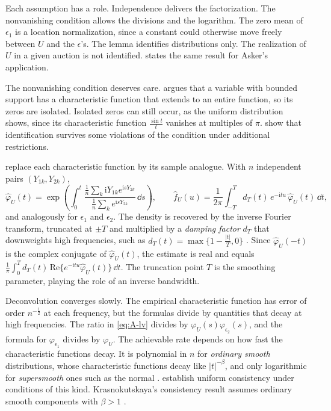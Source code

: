 Each assumption has a role. Independence delivers the factorization. The nonvanishing condition allows
the divisions and the logarithm. The zero mean of $\epsilon_1$ is a location normalization, since a
constant could otherwise move freely between $U$ and the $\epsilon$'s. The lemma identifies
distributions only. The realization of $U$ in a given auction is not identified.  states
the same result for Asker's application.

The nonvanishing condition deserves care. \citet[Lemma~1]{Krasnokutskaya2011} argues that a variable
with bounded support has a characteristic function that extends to an entire function, so its zeros are
isolated. Isolated zeros can still occur, as the uniform distribution shows, since its characteristic
function $\frac{\sin t}{t}$ vanishes at multiples of $\pi$. \citet{EvdokimovWhite2012} show that
identification survives some violations of the condition under additional restrictions.

\citet{LiVuong1998} replace each characteristic function by its sample analogue. With $n$ independent
pairs $(Y_{1k},Y_{2k})$,
\begin{equation}\label{eq:A-lv}
\hat\varphi_U(t)=\exp\left(\int_0^t\frac{\frac{1}{n}\sum_k\mathrm{i}Y_{1k}e^{\mathrm{i}sY_{2k}}}{\frac{1}{n}\sum_ke^{\mathrm{i}sY_{2k}}}\,\dd s\right),\qquad
\hat f_U(u)=\frac{1}{2\pi}\int_{-T}^{T}d_T(t)\,e^{-\mathrm{i}tu}\,\hat\varphi_U(t)\,\dd t ,
\end{equation}
and analogously for $\epsilon_1$ and $\epsilon_2$. The density is recovered by the inverse Fourier
transform, truncated at $\pm T$ and multiplied by a \emph{damping factor} $d_T$ that downweights high
frequencies, such as $d_T(t)=\max\{1-\frac{|t|}{T},0\}$ \citep{DiggleHall1993}. Since
$\hat\varphi_U(-t)$ is the complex conjugate of $\hat\varphi_U(t)$, the estimate is real and equals
$\frac{1}{\pi}\int_0^Td_T(t)\,\mathrm{Re}\{e^{-\mathrm{i}tu}\hat\varphi_U(t)\}\,\dd t$. The truncation
point $T$ is the smoothing parameter, playing the role of an inverse bandwidth.

Deconvolution converges slowly. The empirical characteristic function has error of order
$n^{-\frac{1}{2}}$ at each frequency, but the formulas divide by quantities that decay at high
frequencies. The ratio in \eqref{eq:A-lv} divides by $\varphi_U(s)\varphi_{\epsilon_2}(s)$, and the formula
for $\varphi_{\epsilon_1}$ divides by $\varphi_U$. The achievable rate depends on how fast the characteristic
functions decay. It is polynomial in $n$ for \emph{ordinary smooth} distributions, whose characteristic
functions decay like $|t|^{-\beta}$, and only logarithmic for \emph{supersmooth} ones such as the normal
\citep{Fan1991}. \citet{LiVuong1998} establish uniform consistency under conditions of this kind.
Krasnokutskaya's consistency result assumes ordinary smooth components with $\beta>1$
\citep[Proposition~5]{Krasnokutskaya2011}.

